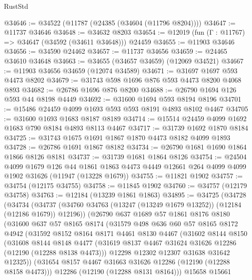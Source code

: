 \begin{lexlean}{RustStd}
\begin{coremodule}
@34646 := @34522 (@11787 (@24385 (@34604 (@11796 @8204))))
@34647 := @11737 @34646
@34648 := @34632 @8203
@34654 := @12019 (fun (Γ : @11767) => @34647 (@34592 (@34611 @34648))) @24459
@34655 := @11903 @34646
@34656 := @34590 @24462
@34657 := @11737 @34656
@34659 := @24465 @34610 @34648
@34663 := @34655 (@34657 @34659) (@12069 @34521)
@34667 := @11903 @34656 @34659 (@12074 @34589)
@34671 := @31697 @1697 @593 @4473 @8202
@34679 := @31743 @598 @1696 @876 @593 @4473 @8200 @4068 @893
@34682 := @26786 @1696 @876 @8200
@34688 := @26790 @1694 @126 @593 @44 @8198 @4449
@34692 := @31600 @1694 @593 @8194 @8196
@34701 := @15486 @24459 @4099 @1693 @593 @593 @8191 @4893 @8102 @4467
@34705 := @31600 @1693 @1683 @8187 @8189
@34714 := @15514 @24459 @4099 @1692 @1683 @790 @8184 @4893 @8113 @4467
@34717 := @31739 @1692 @1870 @8184
@34725 := @31743 @1675 @1691 @1867 @1870 @4473 @8182 @4099 @1893
@34728 := @26786 @1691 @1867 @8182
@34734 := @26790 @1681 @1690 @1864 @1866 @8126 @8181
@34737 := @31739 @1681 @1864 @8126
@34754 := @24504
    @4099
    @1679
    @126
    @44
    @1861
    @1863
    @4473
    @4449
    @12661
    @264
    @4099
    @4099
    @1902
    @31626
    (@11947 (@13228 @1679))
@34755 := @11821 @1902
@34757 := @34754 (@12175 @34755)
@34758 := @11845 @1902
@34760 := @34757 (@12179 @34758)
@34763 := @12184 (@13239 @1861 @1863)
@34895 := @34725
    (@34728
      (@34734
        (@34737 (@34760 @34763 (@13247 (@13249 @1679 @13252)) (@12184 (@12186 @1679)) @12196))
        (@26790
          @637
          @1689
          @57
          @1861
          @8176
          @8180
          (@31600
            @637
            @57
            @8165
            @8174
            (@31579
              @498
              @636
              @60
              @57
              @8165
              @8172
              @4942
              (@31592
                @8152
                @8164
                @8171
                @4461
                @8130
                @4467
                (@31602
                  @8144
                  @8150
                  (@31608
                    @8144
                    @8148
                    @4477
                    (@31619 @8137 @4467 @31624 @31626 @12286 (@12190 (@12288 @8138 @4473)))
                    @12298
                    @12302
                    @12307
                    @31638
                    @31642
                    @12325))
                (@31654 @8157 @4467 @31663 @31626 @12286 (@12190 (@12288 @8158 @4473)))
                @12286
                (@12190 (@12288 @8131 @8164)))
              @15658
              @15661

\end{coremodule}
\end{lexlean}
